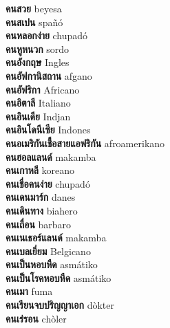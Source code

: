 \textbf{ คนสวย  } beyesa \\
\textbf{ คนสเปน  } spañó \\
\textbf{ คนหลอกง่าย  } chupadó \\
\textbf{ คนหูหนวก  } sordo \\
\textbf{ คนอังกฤษ  } Ingles \\
\textbf{ คนอัฟกานิสถาน  } afgano \\
\textbf{ คนอัฟริกา  } Africano \\
\textbf{ คนอิตาลี  } Italiano \\
\textbf{ คนอินเดีย  } Indjan \\
\textbf{ คนอินโดนีเซีย  } Indones \\
\textbf{ คนอเมริกันเชื้อสายแอฟริกัน  } afroamerikano \\
\textbf{ คนฮอลแลนด์  } makamba \\
\textbf{ คนเกาหลี  } koreano \\
\textbf{ คนเชื่อคนง่าย  } chupadó \\
\textbf{ คนเดนมาร์ก  } danes \\
\textbf{ คนเดินทาง  } biahero \\
\textbf{ คนเถื่อน  } barbaro \\
\textbf{ คนเนเธอร์แลนด์  } makamba \\
\textbf{ คนเบลเยี่ยม  } Belgicano \\
\textbf{ คนเป็นหอบหืด  } asmátiko \\
\textbf{ คนเป็นโรคหอบหืด  } asmátiko \\
\textbf{ คนเมา  } fuma \\
\textbf{ คนเรียนจบปริญญาเอก  } dòkter \\
\textbf{ คนเร่รอน  } chòler \\
